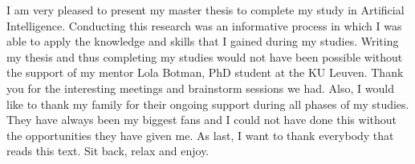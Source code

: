 \documentclass[master=mai,masteroption=eg,english]{kulemt}
\begin{document}
\begin{preface}
	I am very pleased to present my master thesis to complete my study in Artificial Intelligence. Conducting this research was an informative process in which I was able to apply the knowledge and skills that I gained during my studies. Writing my thesis and thus completing my studies would not have been possible
	without the support of my mentor Lola Botman, PhD student at the KU Leuven. Thank you for the interesting meetings and brainstorm sessions we had. Also, I would like to thank my family for their ongoing support during all phases of my studies. They have always been my biggest fans and I could not have done this without the opportunities they have given me. As last, I want to thank everybody that reads this text. Sit back, relax and enjoy.
\end{preface}

\tableofcontents*
\end{document}
